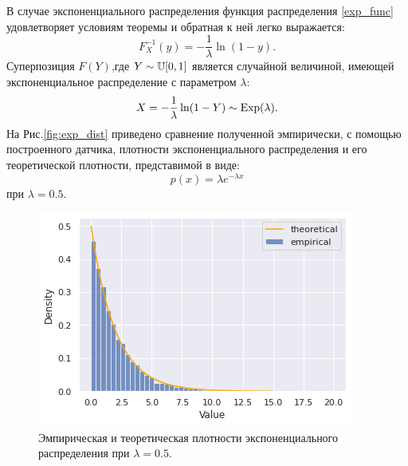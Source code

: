 В случае экспоненциального распределения функция распределения \eqref{exp_func}
 удовлетворяет условиям теоремы и обратная к ней легко выражается:
$$
    F_X^{-1}(y) = -\frac{1}{\lambda} \ln(1 - y).
$$
Суперпозиция $ F(Y) $,где $ Y \sim \operatorname{\mathbb{U}}[0,1] $ является случайной величиной,
 имеющей экспоненциальное распределение с параметром $ \lambda $:
$$
 X = -\frac{1}{\lambda} \ln(1 - Y) \sim \operatorname{\mathrm{Exp}}(\lambda).
$$
На Рис.\eqref{fig:exp_dist} приведено сравнение полученной эмпирически,
 с помощью построенного датчика, плотности экспоненциального распределения
 и его теоретической плотности, представимой в виде:
$$
p(x) = \lambda e^{-\lambda x}
$$
при $ \lambda = 0.5 $.

 \begin{figure}[ht]
	\centering
	\includegraphics[width = 0.7\linewidth]{"./resources/exp_dist.png"}
	\caption{Эмпирическая и теоретическая плотности экспоненциального
     распределения при $ \lambda = 0.5 $.}
    \label{fig:exp_dist}
\end{figure}

